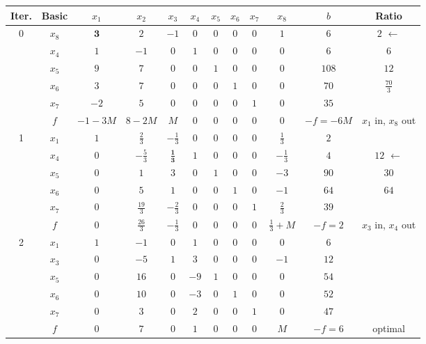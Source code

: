 \documentclass[11pt,a4paper]{article}
\begin{document}
\begin{center}\renewcommand{\arraystretch}{1.35}\setlength{\tabcolsep}{4.5pt}\small
\begin{tabular}{|c|c|cccccccc|c|c|}
\hline
\rowcolor{headgray}\textbf{Iter.} & \textbf{Basic} & $x_{1}$ & $x_{2}$ & $x_{3}$ & $x_{4}$ & $x_{5}$ & $x_{6}$ & $x_{7}$ & $x_{8}$ & $b$ & \textbf{Ratio} \\ \hline
\multirow{6}{*}{0} & $x_{8}$ & \cellcolor{pivot}$\mathbf{3}$ & $2$ & $-1$ & $0$ & $0$ & $0$ & $0$ & $1$ & $6$ & $2$ $\leftarrow$ \\
 & $x_{4}$ & $1$ & $-1$ & $0$ & $1$ & $0$ & $0$ & $0$ & $0$ & $6$ & $6$ \\
 & $x_{5}$ & $9$ & $7$ & $0$ & $0$ & $1$ & $0$ & $0$ & $0$ & $108$ & $12$ \\
 & $x_{6}$ & $3$ & $7$ & $0$ & $0$ & $0$ & $1$ & $0$ & $0$ & $70$ & $\tfrac{70}{3}$ \\
 & $x_{7}$ & $-2$ & $5$ & $0$ & $0$ & $0$ & $0$ & $1$ & $0$ & $35$ &  \\
\cline{2-12}
 & $f$ & $-1-3M$ & $8-2M$ & $M$ & $0$ & $0$ & $0$ & $0$ & $0$ & $-f=-6M$ & $x_{1}$ in, $x_{8}$ out \\ \hline
\multirow{6}{*}{1} & $x_{1}$ & $1$ & $\tfrac{2}{3}$ & $-\tfrac{1}{3}$ & $0$ & $0$ & $0$ & $0$ & $\tfrac{1}{3}$ & $2$ &  \\
 & $x_{4}$ & $0$ & $-\tfrac{5}{3}$ & \cellcolor{pivot}$\mathbf{\tfrac{1}{3}}$ & $1$ & $0$ & $0$ & $0$ & $-\tfrac{1}{3}$ & $4$ & $12$ $\leftarrow$ \\
 & $x_{5}$ & $0$ & $1$ & $3$ & $0$ & $1$ & $0$ & $0$ & $-3$ & $90$ & $30$ \\
 & $x_{6}$ & $0$ & $5$ & $1$ & $0$ & $0$ & $1$ & $0$ & $-1$ & $64$ & $64$ \\
 & $x_{7}$ & $0$ & $\tfrac{19}{3}$ & $-\tfrac{2}{3}$ & $0$ & $0$ & $0$ & $1$ & $\tfrac{2}{3}$ & $39$ &  \\
\cline{2-12}
 & $f$ & $0$ & $\tfrac{26}{3}$ & $-\tfrac{1}{3}$ & $0$ & $0$ & $0$ & $0$ & $\tfrac{1}{3}+M$ & $-f=2$ & $x_{3}$ in, $x_{4}$ out \\ \hline
\multirow{6}{*}{2} & $x_{1}$ & $1$ & $-1$ & $0$ & $1$ & $0$ & $0$ & $0$ & $0$ & $6$ &  \\
 & $x_{3}$ & $0$ & $-5$ & $1$ & $3$ & $0$ & $0$ & $0$ & $-1$ & $12$ &  \\
 & $x_{5}$ & $0$ & $16$ & $0$ & $-9$ & $1$ & $0$ & $0$ & $0$ & $54$ &  \\
 & $x_{6}$ & $0$ & $10$ & $0$ & $-3$ & $0$ & $1$ & $0$ & $0$ & $52$ &  \\
 & $x_{7}$ & $0$ & $3$ & $0$ & $2$ & $0$ & $0$ & $1$ & $0$ & $47$ &  \\
\cline{2-12}
 & $f$ & $0$ & $7$ & $0$ & $1$ & $0$ & $0$ & $0$ & $M$ & $-f=6$ & optimal \\ \hline
\end{tabular}\end{center}
\end{document}

